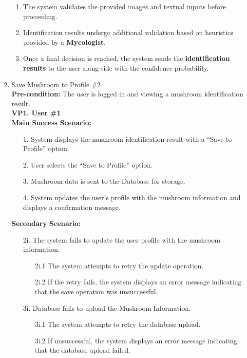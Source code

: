 \documentclass{article}
\begin{document}
\begin{enumerate}[{\bf BE1.}]
\begin{enumerate}[1.]
			\item The system validates the provided images and textual inputs before proceeding.  
			\item Identification results undergo additional validation based on heuristics provided by a \textbf{Mycologist}.  
			\item Once a final decision is reached, the system sends the \textbf{identification results} to the user along side with the confidence probability.  
			\endgroup
		\end{enumerate}
	\item Save Mushroom to Profile \#2\\
	    \textbf{Pre-condition:} The user is logged in and viewing a mushroom identification result.\\[1mm]
	    
	    \textbf{VP1. User \#1}\\
	    \textbf{Main Success Scenario:}
	    \begin{enumerate}
	        \item[1.] System displays the mushroom identification result with a ``Save to Profile'' option.
	        \item[2.] User selects the ``Save to Profile'' option.
	        \item[3.] Mushroom data is sent to the Database for storage.
	        \item[4.] System updates the user's profile with the mushroom information and displays a confirmation message.
	    \end{enumerate}
	    \textbf{Secondary Scenario:}
	    {
	    \begin{enumerate}
	        \item[2i.] The system fails to update the user profile with the mushroom information.
	        \begin{enumerate}
	            \item[2i.1] The system attempts to retry the update operation.
	            \item[2i.2] If the retry fails, the system displays an error message indicating that the save operation was unsuccessful. 
	        \end{enumerate}
	        \item[3i.] Database fails to upload the Mushroom Information.
	        \begin{enumerate}
	            \item[3i.1] The system attempts to retry the database upload.
	            \item[3i.2] If unsuccessful, the system displays an error message indicating that the database upload failed.

\end{enumerate}
\end{enumerate}}
\end{enumerate}
\end{document}
